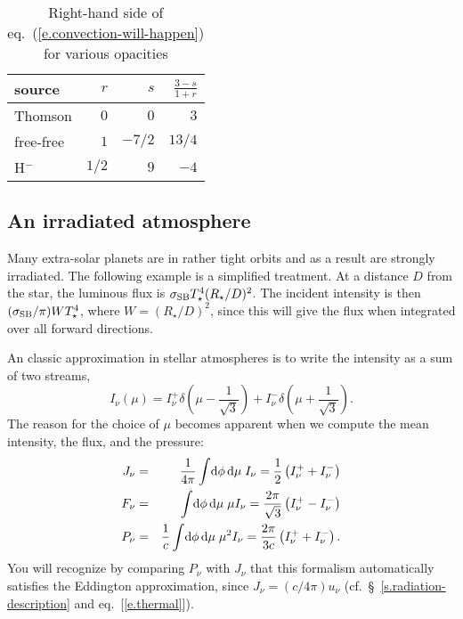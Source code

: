 \begin{table}[htbp]
\caption{Right-hand side of eq.~(\ref{e.convection-will-happen}) for various opacities}
\label{t.rhs}
\begin{center}
\begin{tabular}{lrrr}
\hline
source & $r$ & $s$ & $\frac{3-s}{1+r}$\\
\hline\hline
Thomson & $0$ & $0$ & $3$\\
free-free & $1$ & $-7/2$ & $13/4$\\
H$^{-}$ & $1/2$ & $9$ & $-4$\\
\hline
\end{tabular}
\end{center}
\end{table}

\subsection{An irradiated atmosphere}\label{s.two-stream}

Many extra-solar planets are in rather tight orbits and as a result are strongly irradiated.  The following example is a simplified treatment\cite{Hummer1982The-effect-of-r,Hubeny2003A-Possible-Bifu}. At a distance $D$ from the star, the luminous flux is $\sigma_{\mathrm{SB}} T_{\star}^{4}(R_{\star}/D)^{2}$. The incident intensity is then $(\sigma_{\mathrm{SB}}/\pi)WT_{\star}^{4}$, where $W = (R_{\star}/D)^{2}$, since this will give the flux when integrated over all forward directions. 

An classic approximation in stellar atmospheres is to write the intensity as a sum of two streams,
\begin{equation}\label{e.two-stream}
I_{\nu}(\mu) = I_{\nu}^{+}\delta\left(\mu-\frac{1}{\sqrt{3}}\right) + I_{\nu}^{-}\delta\left(\mu + \frac{1}{\sqrt{3}}\right).
\end{equation}
The reason for the choice of $\mu$ becomes apparent when we compute the mean intensity, the flux, and the pressure:
\begin{eqnarray*}
J_{\nu} &=& \frac{1}{4\pi}\int\!\mathrm{d}\phi\,\mathrm{d}\mu\; I_{\nu} = \frac{1}{2}\left(I_{\nu}^{+} + I_{\nu}^{-}\right)\\
F_{\nu} &=& \int\!\mathrm{d}\phi\,\mathrm{d}\mu\;\mu I_{\nu} = \frac{2\pi}{\sqrt{3}} \left( I_{\nu}^{+} - I_{\nu}^{-}\right)\\
P_{\nu} &=& \frac{1}{c} \int\!\mathrm{d}\phi\,\mathrm{d}\mu\;\mu^{2} I_{\nu} = \frac{2\pi}{3c}\left(I_{\nu}^{+} + I_{\nu}^{-}\right).\\
\end{eqnarray*}
You will recognize by comparing $P_{\nu}$ with $J_{\nu}$ that this formalism automatically satisfies the Eddington approximation, since $J_{\nu} = (c/4\pi)u_{\nu}$ (cf.\ \S~\ref{s.radiation-description} and eq.~[\ref{e.thermal}]).

